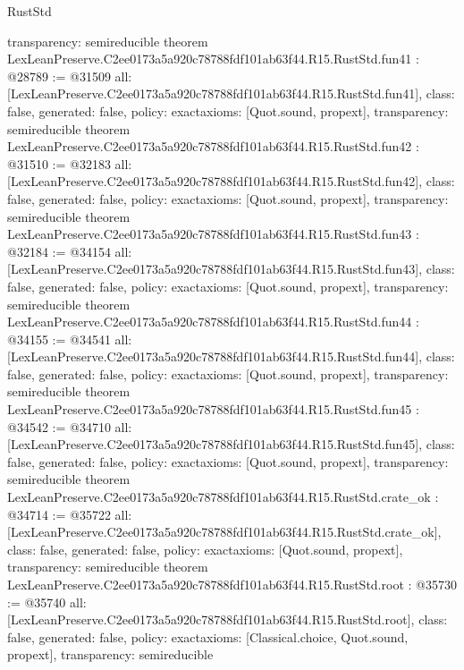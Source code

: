 \begin{lexlean}{RustStd}
\begin{coremodule}
{  transparency: semireducible
}
theorem LexLeanPreserve.C2ee0173a5a920c78788fdf101ab63f44.R15.RustStd.fun41 : @28789 := @31509 {
  all: [LexLeanPreserve.C2ee0173a5a920c78788fdf101ab63f44.R15.RustStd.fun41],
  class: false,
  generated: false,
  policy: exact{axioms: [Quot.sound, propext]},
  transparency: semireducible
}
theorem LexLeanPreserve.C2ee0173a5a920c78788fdf101ab63f44.R15.RustStd.fun42 : @31510 := @32183 {
  all: [LexLeanPreserve.C2ee0173a5a920c78788fdf101ab63f44.R15.RustStd.fun42],
  class: false,
  generated: false,
  policy: exact{axioms: [Quot.sound, propext]},
  transparency: semireducible
}
theorem LexLeanPreserve.C2ee0173a5a920c78788fdf101ab63f44.R15.RustStd.fun43 : @32184 := @34154 {
  all: [LexLeanPreserve.C2ee0173a5a920c78788fdf101ab63f44.R15.RustStd.fun43],
  class: false,
  generated: false,
  policy: exact{axioms: [Quot.sound, propext]},
  transparency: semireducible
}
theorem LexLeanPreserve.C2ee0173a5a920c78788fdf101ab63f44.R15.RustStd.fun44 : @34155 := @34541 {
  all: [LexLeanPreserve.C2ee0173a5a920c78788fdf101ab63f44.R15.RustStd.fun44],
  class: false,
  generated: false,
  policy: exact{axioms: [Quot.sound, propext]},
  transparency: semireducible
}
theorem LexLeanPreserve.C2ee0173a5a920c78788fdf101ab63f44.R15.RustStd.fun45 : @34542 := @34710 {
  all: [LexLeanPreserve.C2ee0173a5a920c78788fdf101ab63f44.R15.RustStd.fun45],
  class: false,
  generated: false,
  policy: exact{axioms: [Quot.sound, propext]},
  transparency: semireducible
}
theorem LexLeanPreserve.C2ee0173a5a920c78788fdf101ab63f44.R15.RustStd.crate_ok : @34714 := @35722 {
  all: [LexLeanPreserve.C2ee0173a5a920c78788fdf101ab63f44.R15.RustStd.crate_ok],
  class: false,
  generated: false,
  policy: exact{axioms: [Quot.sound, propext]},
  transparency: semireducible
}
theorem LexLeanPreserve.C2ee0173a5a920c78788fdf101ab63f44.R15.RustStd.root : @35730 := @35740 {
  all: [LexLeanPreserve.C2ee0173a5a920c78788fdf101ab63f44.R15.RustStd.root],
  class: false,
  generated: false,
  policy: exact{axioms: [Classical.choice, Quot.sound, propext]},
  transparency: semireducible
}


\end{coremodule}
\end{lexlean}
